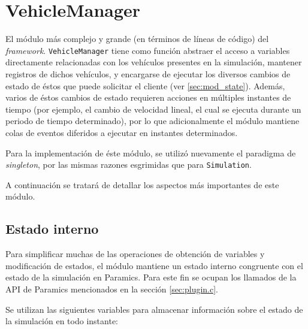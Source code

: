 \section{VehicleManager}\label{sec:vehiclemanager}

El módulo más complejo y grande (en términos de líneas de código) del \emph{framework}. \texttt{VehicleManager} tiene como función abstraer el acceso a variables directamente relacionadas con los vehículos presentes en la simulación, mantener registros de dichos vehículos, y encargarse de ejecutar los diversos cambios de estado de éstos que puede solicitar el cliente (ver \ref{sec:mod_state}). Además, varios de éstos cambios de estado requieren acciones en múltiples instantes de tiempo (por ejemplo, el cambio de velocidad lineal, el cual se ejecuta durante un periodo de tiempo determinado), por lo que adicionalmente el módulo mantiene colas de eventos diferidos a ejecutar en instantes determinados.

Para la implementación de éste módulo, se utilizó nuevamente el paradigma de \emph{singleton}, por las mismas razones esgrimidas que para \texttt{Simulation}.

A continuación se tratará de detallar los aspectos más importantes de este módulo.

\subsection{Estado interno}

Para simplificar muchas de las operaciones de obtención de variables y modificación de estados, el módulo mantiene un estado interno congruente con el estado de la simulación en Paramics. Para este fin se ocupan los llamados de la API de Paramics mencionados en la sección \ref{sec:plugin.c}.

Se utilizan las siguientes variables para almacenar información sobre el estado de la simulación en todo instante:

